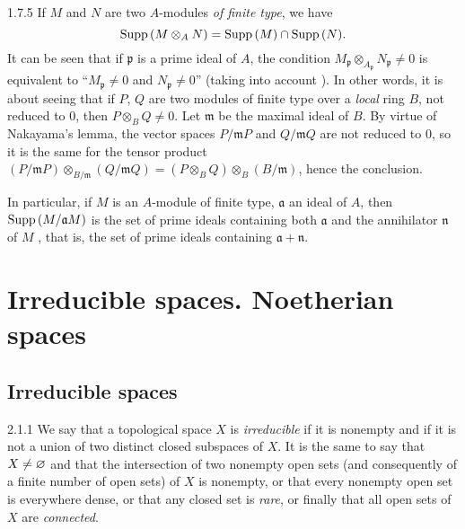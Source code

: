 \begin{env}{1.7.5}
\label{env-0.1.7.5}
If $M$ and $N$ are two $A$-modules \emph{of finite type}, we have
\[
  {\mathop{\mathrm{Supp}}\nolimits}\,(M\otimes_A N)={\mathop{\mathrm{Supp}}\nolimits}\,(M)\cap{\mathop{\mathrm{Supp}}\nolimits}\,(N).
\]
It can be seen that if $\mathfrak{p}$ is a prime ideal of $A$, the condition
$M_\mathfrak{p}\otimes_{A_\mathfrak{p}}N_\mathfrak{p}\neq 0$ is equivalent to
``$M_\mathfrak{p}\neq 0$ and $N_\mathfrak{p}\neq 0$'' (taking into account
). In other words, it is about seeing that if $P$, $Q$ are two
modules of finite type over a \emph{local} ring $B$, not reduced to $0$, then
$P\otimes_B Q\neq 0$. Let $\mathfrak{m}$ be the maximal ideal of $B$. By virtue
of Nakayama's lemma, the vector spaces $P/\mathfrak{m}P$ and $Q/\mathfrak{m}Q$
are not reduced to $0$, so it is the same for the tensor product
$(P/\mathfrak{m}P)\otimes_{B/\mathfrak{m}}(Q/\mathfrak{m}Q)
  =(P\otimes_B Q)\otimes_B(B/\mathfrak{m})$, hence the conclusion.

In particular, if $M$ is an $A$-module of finite type, $\mathfrak{a}$ an ideal
of $A$, then ${\mathop{\mathrm{Supp}}\nolimits}\,(M/\mathfrak{a}M)$ is the set of prime ideals containing both
$\mathfrak{a}$ and the annihilator $\mathfrak{n}$ of $M$ , that
is, the set of prime ideals containing $\mathfrak{a}+\mathfrak{n}$.
\end{env}

\section{Irreducible spaces. Noetherian spaces}
\label{0-prelim-2}

\subsection{Irreducible spaces}
\label{0-prelim-2.1}

\begin{env}{2.1.1}
\label{env-0.2.1.1}
We say that a topological space $X$ is \emph{irreducible} if it is nonempty and
if it is not a union of two distinct closed subspaces of $X$. It is the same to
say that $X\neq\varnothing$ and that the intersection of two nonempty open sets (and
consequently of a finite number of open sets) of $X$ is nonempty, or that every
nonempty open set is everywhere dense, or that any closed set is \emph{rare}, or
finally that all open sets of $X$ are \emph{connected}.
\end{env}

